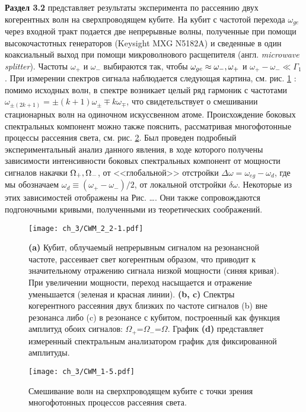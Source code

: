 \textbf{Раздел 3.2} представляет результаты эксперимента по рассеянию двух когерентных волн на сверхпроводящем кубите. На кубит с частотой перехода $\omega_{ge}$ через входной тракт подается две непрерывные волны, полученные при помощи высокочастотных генераторов (Keysight MXG N5182A) и сведенные в один коаксиальный выход при помощи микроволнового расщепителя (англ. \textit{microwave splitter}). Частоты $\omega_+$ и $\omega_-$ выбираются так, чтобы $\omega_{ge}\approx\omega_-,\space\omega_+$ и $\omega_+-\omega_- \ll \Gamma_1$. При измерении спектров сигнала наблюдается следующая картина, см. рис. \ref{fig: fwm_qubit} : помимо исходных волн, в спектре возникает целый ряд гармоник с частотами $\omega_{\pm(2k+1)}=\pm(k+1)\omega_{\pm}\mp k\omega_{\mp}$, что свидетельствует о смешивании стационарных волн на одиночном искуссвенном атоме. Происхождение боковых спектральных компонент можно также пояснить, рассматривая многофотонные процессы рассеяния света, см. рис. \ref{fig: fwm_multphot}. Был проведен подробный экспериментальный анализ данного явления, в ходе которого получены зависимости интенсивности боковых спектральных компонент от мощности сигналов накачки $\Omega_+,\space\Omega_-$, от <<глобальной>> отстройки $\Delta\omega = \omega_{eg}-\omega_d$, где мы обозначаем $\omega_d\equiv(\omega_+-\omega_-)/2$, от локальной отстройки $\delta\omega$. Некоторые из этих зависимостей отображены на Рис. \dots. Они также сопровождаются подгоночными кривыми, полученными из теоретических соображений. 
\begin{figure}[htb]\center
	\texttt{[image: ch\_3/CWM\_2\_2-1.pdf]}
	\caption{\textbf{(a)} Кубит, облучаемый непрерывным сигналом на резонансной частоте, рассеивает свет когерентным образом, что приводит к значительному отражению сигнала низкой мощности (синяя кривая). При увеличении мощности, переход насыщается и отражение уменьшается (зеленая и красная линии). \textbf{(b, c)} Спектры когерентного рассеяния двух близких по частоте сигналов (b) вне резонанса либо (c) в резонансе с кубитом, построенный как функция амплитуд обоих сигналов: $\Omega_+$=$\Omega_-$=$\Omega$. График \textbf{(d)} представляет измеренный спектральным анализатором график для фиксированной амплитуды.}
	\label{fig: fwm_qubit}
\end{figure}

\begin{figure}[htb]\center
	\texttt{[image: ch\_3/CWM\_1-5.pdf]}
	\caption{Смешивание волн на сверхпроводящем кубите с точки зрения многофотонных процессов рассеяния света.}
	\label{fig: fwm_multphot}
\end{figure}

